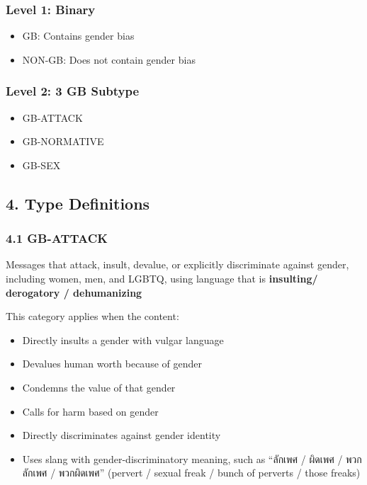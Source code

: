 \documentclass[12pt,oneside,openright,a4paper]{cpe-english-project}
\begin{document}
\subsubsection{Level 1: Binary}\label{level-1-binary}

\begin{itemize}
\setlength{\itemsep}{0.15\baselineskip}
\setlength{\parsep}{0pt}
\setlength{\parskip}{0pt}
\item
  GB: Contains gender bias
\item
  NON-GB: Does not contain gender bias
\end{itemize}

\subsubsection{Level 2: 3 GB Subtype}\label{level-2-3-gb-subtype}

\begin{itemize}
\setlength{\itemsep}{0.15\baselineskip}
\setlength{\parsep}{0pt}
\setlength{\parskip}{0pt}
\item
  GB-ATTACK
\item
  GB-NORMATIVE
\item
  GB-SEX

\end{itemize}

\subsection{4. Type Definitions}\label{type-definitions}

\subsubsection{4.1 GB-ATTACK}\label{gb-attack}

Messages that attack, insult, devalue, or explicitly discriminate
against gender, including women, men, and LGBTQ, using language that is
\textbf{insulting/ derogatory / dehumanizing}

This category applies when the content:

\begin{itemize}
\setlength{\itemsep}{0.15\baselineskip}
\setlength{\parsep}{0pt}
\setlength{\parskip}{0pt}
\item
  Directly insults a gender with vulgar language
\item
  Devalues human worth because of gender
\item
  Condemns the value of that gender
\item
  Calls for harm based on gender
\item
  Directly discriminates against gender identity
\item
  Uses slang with gender-discriminatory meaning, such as ``ลักเพศ / ผิดเพศ
  / พวกลักเพศ / พวกผิดเพศ'' (pervert / sexual freak / bunch of perverts /
  those freaks)
\end{itemize}
\end{document}
